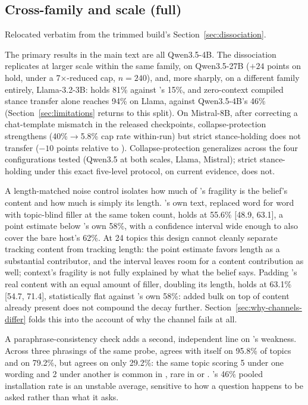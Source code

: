 \subsection{Cross-family and scale (full)}
\label{app:crossfamily}

Relocated verbatim from the trimmed build's Section~\ref{sec:dissociation}.

The primary results in the main text are all Qwen3.5-4B. The dissociation replicates at
larger scale within the same family, on Qwen3.5-27B (\(+24\) points on hold, under a
7\(\times\)-reduced cap, \(n=240\)), and, more sharply, on a different family entirely,
Llama-3.2-3B: \condF{} holds 81\% against \condB{}'s 15\%, and zero-context compiled
stance transfer alone reaches 94\% on Llama, against Qwen3.5-4B's
46\% (Section~\ref{sec:limitations} returns to this split). On
Mistral-8B, after correcting a chat-template mismatch in the released checkpoints,
collapse-protection strengthens (40\%\(\to\)5.8\% cap rate within-run) but strict
stance-holding does not transfer (\(-10\) points relative to \condB{}).
Collapse-protection generalizes across the four configurations tested (Qwen3.5 at both
scales, Llama, Mistral); strict stance-holding under this exact five-level protocol, on
current evidence, does not.

A length-matched noise control isolates how much of \condB{}'s fragility is the
belief's content and how much is simply its length. \condB{}'s own
text, replaced word for word with topic-blind filler at the same token count, holds at
55.6\% [48.9, 63.1], a point estimate below \condB{}'s own 58\%, with a confidence
interval wide enough to also cover the bare host's 62\%. At 24 topics this design cannot
cleanly separate tracking content from tracking length: the point estimate favors length
as a substantial contributor, and the interval leaves room for a content contribution as
well; context's fragility is not fully explained by what the belief says. Padding
\condB{}'s real content with an equal amount of filler, doubling its length, holds at
63.1\% [54.7, 71.4], statistically flat against \condB{}'s own 58\%: added bulk on top of
content already present does not compound the decay further.
Section~\ref{sec:why-channels-differ} folds this into the account of why the channel
fails at all.

A paraphrase-consistency check adds a second, independent line on \condC{}'s
weakness. Across three phrasings of the same probe, \condB{} agrees
with itself on 95.8\% of topics and \condF{} on 79.2\%, but \condC{} agrees on only
29.2\%: the same topic scoring 5 under one wording and 2 under another is common in
\condC{}, rare in \condB{} or \condF{}. \condC{}'s 46\% pooled installation rate is an
unstable average, sensitive to how a question happens to be asked rather than what it
asks.

